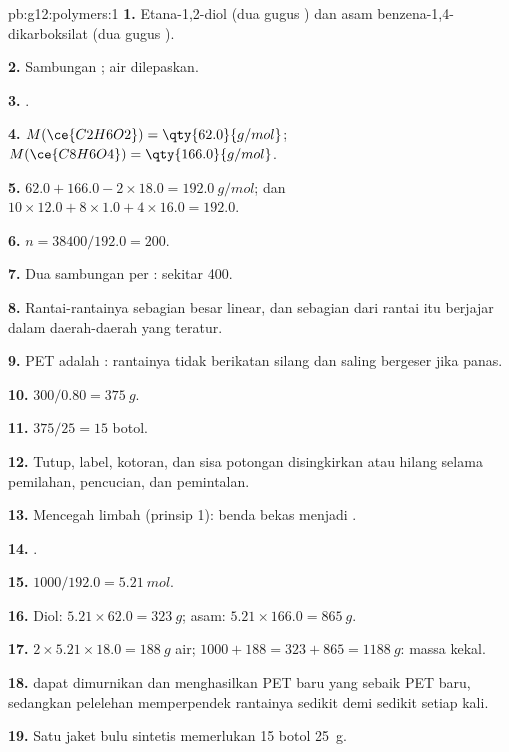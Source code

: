 \begin{solution}{pb:g12:polymers:1}
\textbf{1.} Etana-1,2-diol (dua gugus ) dan asam
benzena-1,4-dikarboksilat (dua gugus ).

\textbf{2.} Sambungan ; air dilepaskan.

\textbf{3.} .

\textbf{4.} $M(\ce{C2H6O2}) = \qty{62.0}{g/mol}$; $M(\ce{C8H6O4}) =
\qty{166.0}{g/mol}$.

\textbf{5.} $62.0 + 166.0 - 2 \times 18.0 = \qty{192.0}{g/mol}$; dan
$10 \times 12.0 + 8 \times 1.0 + 4 \times 16.0 = 192.0$.

\textbf{6.} $n = 38400/192.0 = 200$.

\textbf{7.} Dua sambungan  per : sekitar 400.

\textbf{8.} Rantai-rantainya sebagian besar linear, dan sebagian dari
rantai itu berjajar dalam daerah-daerah yang teratur.

\textbf{9.} PET adalah : rantainya tidak berikatan silang
dan saling bergeser jika panas.

\textbf{10.} $300/0.80 = \qty{375}{g}$.

\textbf{11.} $375/25 = 15$ botol.

\textbf{12.} Tutup, label, kotoran, dan sisa potongan disingkirkan atau
hilang selama pemilahan, pencucian, dan pemintalan.

\textbf{13.} Mencegah limbah (prinsip 1): benda bekas menjadi .

\textbf{14.} .

\textbf{15.} $1000/192.0 = \qty{5.21}{mol}$.

\textbf{16.} Diol: $5.21 \times 62.0 = \qty{323}{g}$; asam:
$5.21 \times 166.0 = \qty{865}{g}$.

\textbf{17.} $2 \times 5.21 \times 18.0 = \qty{188}{g}$ air;
$1000 + 188 = 323 + 865 = \qty{1188}{g}$: massa kekal.

\textbf{18.}  dapat dimurnikan dan menghasilkan PET
baru yang sebaik PET baru, sedangkan pelelehan memperpendek rantainya
sedikit demi sedikit setiap kali.

\textbf{19.} Satu jaket bulu sintetis memerlukan 15 botol \qty{25}{g}.
\end{solution}

